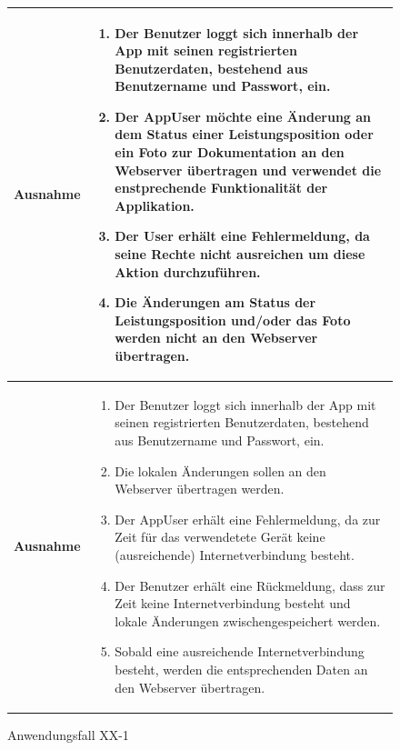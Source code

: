 			\begin{figure}[h]
	\centering
	\begin{tabularx}{\textwidth}{ X | X }
		\textbf{Ausnahme} &
				\begin{enumerate}
				\item Der Benutzer loggt sich innerhalb der App mit seinen registrierten Benutzerdaten, bestehend aus Benutzername und Passwort,  ein.  
					 \item Der AppUser m\"ochte eine \"Anderung an dem Status einer Leistungsposition oder ein Foto zur Dokumentation an den Webserver \"ubertragen und verwendet die enstprechende Funktionalit\"at der Applikation.
					 \item Der User erh\"alt eine Fehlermeldung, da seine Rechte nicht ausreichen um diese Aktion durchzuf\"uhren.
					 \item Die \"Anderungen am Status der Leistungsposition und/oder das Foto werden nicht an den Webserver \"ubertragen.
					 \end{enumerate} \\ \hline
					 	\textbf{Ausnahme} &
				\begin{enumerate}
					\item Der Benutzer loggt sich innerhalb der App mit seinen registrierten Benutzerdaten, bestehend aus Benutzername und Passwort,  ein.  
					\item Die lokalen \"Anderungen sollen an den Webserver \"ubertragen werden.
					\item Der AppUser erh\"alt eine Fehlermeldung,  da zur Zeit f\"ur das verwendetete Ger\"at keine (ausreichende) Internetverbindung besteht. 
					\item Der Benutzer erh\"alt eine R\"uckmeldung,  dass zur Zeit keine Internetverbindung besteht und lokale \"Anderungen zwischengespeichert werden.
					\item Sobald eine ausreichende Internetverbindung besteht,  werden die entsprechenden Daten an den Webserver \"ubertragen.
				\end{enumerate} 
				 	\end{tabularx}
	\caption{Anwendungsfall XX-1}
	\label{fig:anwendungsfall-app-tabelle-xx-3}
\end{figure}
